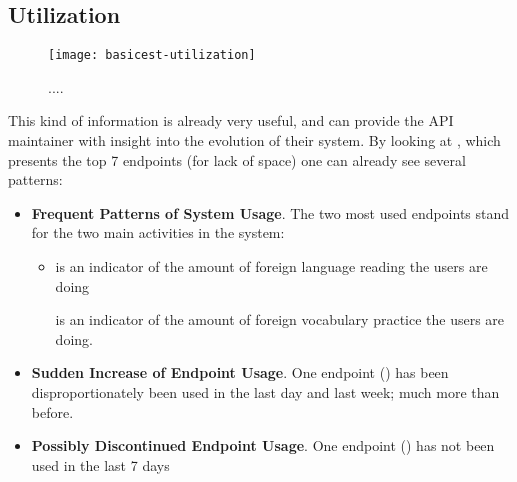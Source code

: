 

\newpage
\subsection{Utilization}
\label{sec:util}




  \begin{figure}[h!]
  \centering
  \texttt{[image: basicest-utilization]}
  \caption{....}
  \label{fig:basicest}
  \end{figure}

This kind of information is already very useful, and can provide the API maintainer with insight into the evolution of their system. By looking at , which presents the top 7 endpoints (for lack of space) one can already see several patterns: 

\begin{itemize}

  \item {\bf Frequent Patterns of System Usage}. The two most used endpoints stand for the two main activities in the system: 

  \begin{itemize}

    \item \epTranslations is an indicator of the amount of foreign language reading the users are doing

    \epOutcome is an indicator of the amount of foreign vocabulary practice the users are doing.

  \end{itemize}

  \item {\bf Sudden Increase of Endpoint Usage}. One endpoint (\epUserActivity) has been disproportionately been used in the last day and last week; much more than before. 

  \item {\bf Possibly Discontinued Endpoint Usage}. One endpoint (\epFeedItems) has not been used in the last 7 days

\end{itemize}

